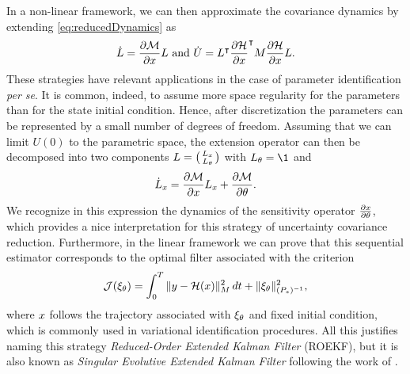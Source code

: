 In a non-linear framework, we can then approximate the covariance dynamics by extending \eqref{eq:reducedDynamics} as
\begin{equation}\label{eq:nl-reducedDynamics}
	\dot{L} = \frac{\partial \mathcal{M}}{\partial x} L \text{ and }
	\dot{U} = L^\intercal \frac{\partial \mathcal{H}}{\partial x}^\intercal M \frac{\partial \mathcal{H}}{\partial x} L.
\end{equation}
These strategies have relevant applications in the case of parameter identification \emph{per se}. It is common, indeed, to assume more space regularity for the parameters than for the state initial condition. Hence, after discretization the parameters can be represented by a small number of degrees of freedom. Assuming that we can limit $U(0)$ to the parametric space, the extension operator can then be decomposed into two components $L = \left( \begin{smallmatrix} L_{x} \\ L_{\theta} \end{smallmatrix} \right)$ with $\Ltheta = \1$ and
\begin{equation}\label{eq:sensitivity}
	\dot{L}_x = \frac{\partial \mathcal{M}}{\partial x} L_{x} + \frac{\partial \mathcal{M}}{\partial \theta}.
\end{equation}
We recognize in this expression the dynamics of the sensitivity operator $\frac{\partial x}{\partial \theta}$, which provides a nice interpretation for this strategy of uncertainty covariance reduction. Furthermore, in the linear framework we can prove that this sequential estimator corresponds to the optimal filter associated with the criterion
\begin{equation}\label{eq:paramCriterion}
	\mathcal{J}(\xi_{\theta}) = \int_0^T \|y-\mathcal{H}(x)\|_{M}^2 \, dt +  \|\xi_{\theta}\|_{(P_{*})^{-1}}^2,
\end{equation}
where $x$ follows the trajectory associated with $\xi_{\theta}$ and fixed initial condition, which is commonly used in variational identification procedures. All this justifies naming this strategy \emph{Reduced-Order Extended Kalman Filter} (ROEKF), but it is also known as \emph{Singular Evolutive Extended Kalman Filter} following the work of \cite{Pham:1998p44}.

